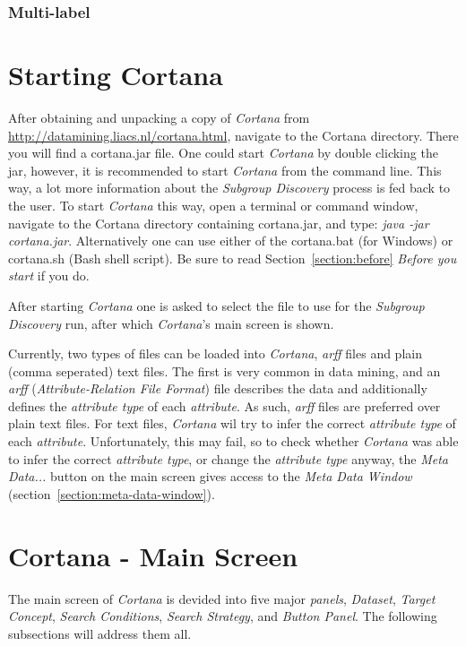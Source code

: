 \documentclass{article}
\begin{document}
\subsubsection{Multi-label}


\section{Starting Cortana}
After obtaining and unpacking a copy of \emph{Cortana} from \url{http://datamining.liacs.nl/cortana.html}, navigate to the Cortana directory.
There you will find a cortana.jar file.
One could start \emph{Cortana} by double clicking the jar, however, it is recommended to start \emph{Cortana} from the command line.
This way, a lot more information about the \emph{Subgroup Discovery} process is fed back to the user.
To start \emph{Cortana} this way, open a terminal or command window, navigate to the Cortana directory containing cortana.jar, and type: \emph{java -jar cortana.jar}.
Alternatively one can use either of the cortana.bat (for Windows) or cortana.sh (Bash shell script).
Be sure to read Section~\ref{section:before} \emph{Before you start} if you do.

After starting \emph{Cortana} one is asked to select the file to use for the \emph{Subgroup Discovery} run, after which \emph{Cortana}'s main screen is shown.

Currently, two types of files can be loaded into \emph{Cortana}, \emph{arff} files and plain (comma seperated) text files.
The first is very common in data mining, and an \emph{arff} (\emph{Attribute-Relation File Format}) file describes the data and additionally defines the \emph{attribute type} of each \emph{attribute}.
As such, \emph{arff} files are preferred over plain text files.
For text files, \emph{Cortana} wil try to infer the correct \emph{attribute type} of each \emph{attribute}.
Unfortunately, this may fail, so to check whether \emph{Cortana} was able to infer the correct \emph{attribute type}, or change the \emph{attribute type} anyway, the \emph{Meta Data...} button on the main screen gives access to the \emph{Meta Data Window} (section~\ref{section:meta-data-window}).





\section{Cortana - Main Screen}
\label{section:main}
The main screen of \emph{Cortana} is devided into five major \emph{panels}, \emph{Dataset}, \emph{Target Concept}, \emph{Search Conditions}, \emph{Search Strategy}, and \emph{Button Panel}.
The following subsections will address them all.
\end{document}
